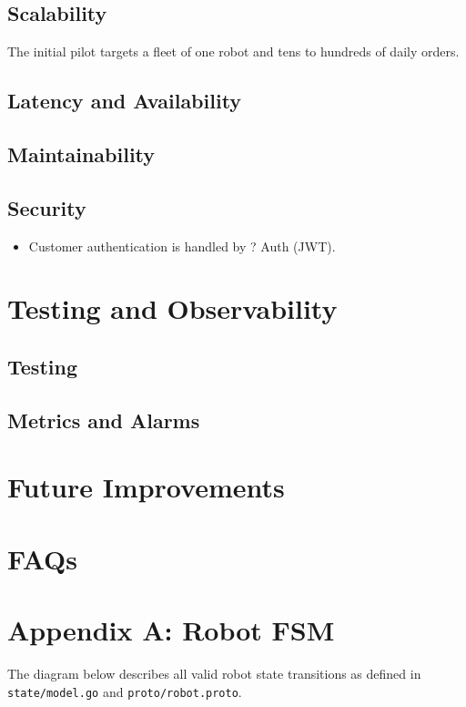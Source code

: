 \documentclass[12pt,a4paper]{article}
\begin{document}
\subsection{Scalability}
The initial pilot targets a fleet of one robot and tens to hundreds of daily orders.

\subsection{Latency and Availability}

\subsection{Maintainability}

\subsection{Security}
\begin{itemize}
  \item Customer authentication is handled by ? Auth (JWT).
\end{itemize}

\newpage
\section{Testing and Observability}

\subsection{Testing}

\subsection{Metrics and Alarms}

\newpage
\section{Future Improvements}

\newpage
\section{FAQs}

\newpage
\appendix
\section{Appendix A: Robot FSM}
The diagram below describes all valid robot state transitions as defined in \texttt{state/model.go} and \texttt{proto/robot.proto}.
\end{document}
